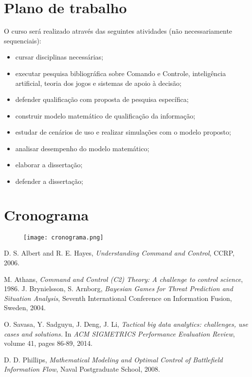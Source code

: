 \documentclass[a4paper,12pt]{article}
\begin{document}
\section{Plano de trabalho}
O curso será realizado através das seguintes atividades (não necessariamente sequenciais):
\begin{itemize}
 \item cursar disciplinas necessárias;
 \item executar pesquisa bibliográfica sobre Comando e Controle, inteligência artificial, teoria dos jogos e sistemas de apoio 
 à decisão;
 \item defender qualificação com proposta de pesquisa específica;
 \item construir modelo matemático de qualificação da informação;
 \item estudar de cenários de uso e realizar simulações com o modelo proposto;
 \item analisar desempenho do modelo matemático;
  \item elaborar a dissertação;
 \item defender a dissertação;
\end{itemize}

\section{Cronograma}
\begin{figure}[!hbp]
  \texttt{[image: cronograma.png]}
\end{figure}

\begin{thebibliography}{1}

D. S. Albert and R. E. Hayes, \emph{Understanding Command and Control}, CCRP, 2006.

M. Athans, \emph{Command and Control (C2) Theory: A challenge to control science}, 1986.
J. Brynielsson, S. Arnborg, \emph{Bayesian Games for Threat Prediction and Situation Analysis}, Seventh International
Conference on Information Fusion, Sweden, 2004.

O. Savasa, Y. Sadguyu, J. Deng, J. Li, \emph{Tactical big data analytics: challenges, use cases and solutions.} In 
\textit{ACM SIGMETRICS Performance Evaluation Review}, volume 41, pages 86-89, 2014.

 D. D. Phillips, \emph{Mathematical Modeling and Optimal Control of Battlefield Information Flow}, Naval Postgraduate School, 
 2008.

\end{thebibliography}
\end{document}
